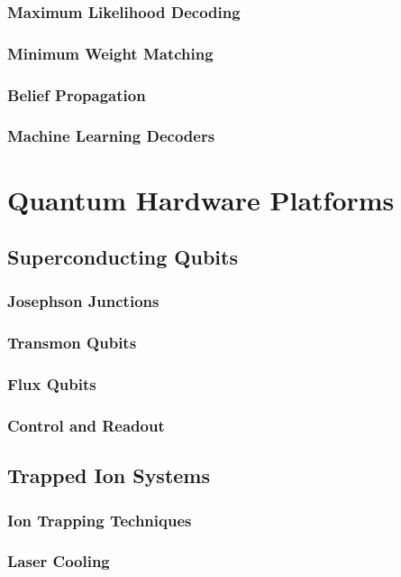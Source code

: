 \documentclass[12pt,a4paper]{book}
\begin{document}
\subsection{Maximum Likelihood Decoding}
\subsection{Minimum Weight Matching}
\subsection{Belief Propagation}
\subsection{Machine Learning Decoders}

\chapter{Quantum Hardware Platforms}

\section{Superconducting Qubits}
\subsection{Josephson Junctions}
\subsection{Transmon Qubits}
\subsection{Flux Qubits}
\subsection{Control and Readout}

\section{Trapped Ion Systems}
\subsection{Ion Trapping Techniques}
\subsection{Laser Cooling}
\end{document}
